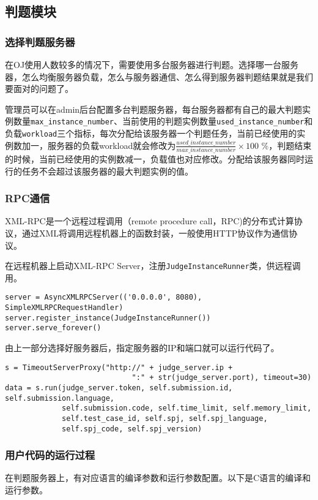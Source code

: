 \subsection{判题模块}

\subsubsection{选择判题服务器}
在OJ使用人数较多的情况下，需要使用多台服务器进行判题。选择哪一台服务器，怎么均衡服务器负载，怎么与服务器通信、怎么得到服务器判题结果就是我们要面对的问题了。

管理员可以在admin后台配置多台判题服务器，每台服务器都有自己的最大判题实例数量\texttt{max\_instance\_number}、当前使用的判题实例数量\texttt{used\_instance\_number}和负载\texttt{workload}三个指标，每次分配给该服务器一个判题任务，当前已经使用的实例数加一，服务器的负载workload就会修改为${\frac {used\_instance\_number}{max\_instance\_number}} \times 100$ \%，判题结束的时候，当前已经使用的实例数减一，负载值也对应修改。分配给该服务器同时运行的任务不会超过该服务器的最大判题实例的值。

\subsubsection{RPC通信}
XML-RPC是一个远程过程调用（remote procedure call，RPC)的分布式计算协议，通过XML将调用远程机器上的函数封装，一般使用HTTP协议作为通信协议。

在远程机器上启动XML-RPC Server，注册\texttt{JudgeInstanceRunner}类，供远程调用。

\begin{verbatim}
server = AsyncXMLRPCServer(('0.0.0.0', 8080), SimpleXMLRPCRequestHandler)
server.register_instance(JudgeInstanceRunner())
server.serve_forever()
\end{verbatim}

由上一部分选择好服务器后，指定服务器的IP和端口就可以运行代码了。

\begin{verbatim}
s = TimeoutServerProxy("http://" + judge_server.ip + 
                             ":" + str(judge_server.port), timeout=30)
data = s.run(judge_server.token, self.submission.id, self.submission.language,
             self.submission.code, self.time_limit, self.memory_limit, 
             self.test_case_id, self.spj, self.spj_language,
             self.spj_code, self.spj_version)
\end{verbatim}

\subsubsection{用户代码的运行过程}
在判题服务器上，有对应语言的编译参数和运行参数配置。以下是C语言的编译和运行参数。

